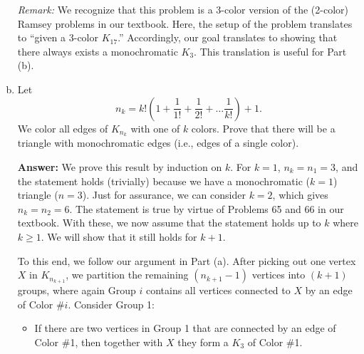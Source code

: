\documentclass[11pt]{article}
\newcommand{\f}[2]{\frac{#1}{#2}}
\begin{document}
\begin{enumerate}[(a)]
	
	
	\textit{Remark:} We recognize that this problem is a 3-color version of the (2-color) Ramsey problems in our textbook. Here, the setup of the problem translates to ``given a 3-color $K_{17}$.'' Accordingly, our goal translates to showing that there always exists a monochromatic $K_3$. This translation is useful for Part (b).
	
	\item Let
	\begin{equation*}
	n_k = k! \left( 1 + \f{1}{1!}  + \f{1}{2!} + \dots \f{1}{k!} \right) + 1.
	\end{equation*}
	We color all edges of $K_{n_k}$ with one of $k$ colors. Prove that there will be a triangle with monochromatic edges (i.e., edges of a single color).
	
	\textbf{Answer:} We prove this result by induction on $k$. For $k=1$, $n_k = n_1 = 3$, and the statement holds (trivially) because we have a monochromatic ($k=1$) triangle ($n=3$). Just for assurance, we can consider $k=2$, which gives $n_k = n_2 = 6$. The statement is true by virtue of Problems 65 and 66 in our textbook.  With these, we now assume that the statement holds up to $k$ where $k\geq 1$. We will show that it still holds for $k+1$. 
	
	To this end, we follow our argument in Part (a). After picking out one vertex $X$ in $K_{n_{k+1}}$, we partition the remaining $(n_{k+1}-1)$ vertices into $(k+1)$ groups, where again Group $i$ contains all vertices connected to $X$ by an edge of Color \#$i$. Consider Group 1:
	\begin{itemize}
		\item If there are two vertices in Group 1 that are connected by an edge of Color \#1, then together with $X$ they form a $K_3$ of Color \#1.
		

\end{itemize}
\end{enumerate}
\end{document}
